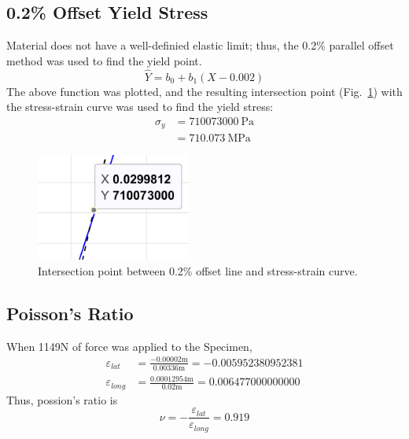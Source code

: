 \documentclass[conference, letterpaper]{IEEEtran}
\begin{document}
    \subsection{0.2\% Offset Yield Stress}
        Material does not have a well-definied elastic limit; thus, the 0.2\% parallel offset method\cite{Hibbeler2022} was used to find the yield point.
        \[
            \hat{Y} = b_0 + b_{1}(X-0.002)
        \]
        The above function was plotted, and the resulting intersection point (Fig.\ \ref{fig2}) with the stress-strain curve was used to find the yield stress:
        \begin{align*}
            \sigma_y 
            &= 710073000\ \text{Pa} \\
            &= 710.073\ \text{MPa}
        \end{align*}
        \vspace*{-\baselineskip}
        \begin{figure}[htbp]
            \centerline{\includegraphics[width = 2in]{figures/intersection1.png}}
            \caption{Intersection point between 0.2\% offset line and stress-strain curve.}\label{fig2}
            \end{figure}
    \subsection{Poisson's Ratio}
        When 1149N of force was applied to the Specimen,
        \begin{align*}
            \varepsilon_{lat} 
            &= \frac{-0.00002\text{m}}{0.00336\text{m}} = -0.005952380952381 \\
            \varepsilon_{long}
            &= \frac{0.00012954\text{m}}{0.02\text{m}} = 0.006477000000000
        \end{align*}
        Thus, possion's ratio is
        \[
            \nu = - \frac{\varepsilon_{lat}}{\varepsilon_{long}}
            = 0.919
        \]
\end{document}
